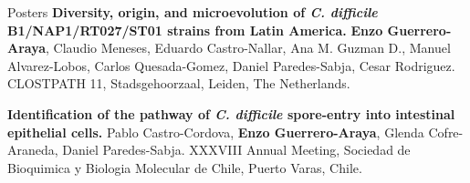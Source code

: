 \begin{rubric}{Posters}
\entry*[2019]%
	\textbf{Diversity, origin, and microevolution of \emph{C. difficile} B1/NAP1/RT027/ST01 strains from Latin America.}
	\textbf{Enzo Guerrero-Araya}, Claudio Meneses, Eduardo Castro-Nallar, Ana M. Guzman D., Manuel Alvarez-Lobos, Carlos Quesada-Gomez, Daniel Paredes-Sabja, Cesar Rodriguez. CLOSTPATH 11, Stadsgehoorzaal, Leiden, The Netherlands.

\entry*[2015]%
	\textbf{Identification of the pathway of \emph{C. difficile} spore-entry into intestinal epithelial cells.}
	Pablo Castro-Cordova, \textbf{Enzo Guerrero-Araya}, Glenda Cofre-Araneda, Daniel Paredes-Sabja. XXXVIII Annual Meeting, Sociedad de Bioquimica y Biologia Molecular de Chile, Puerto Varas, Chile.
\end{rubric}
